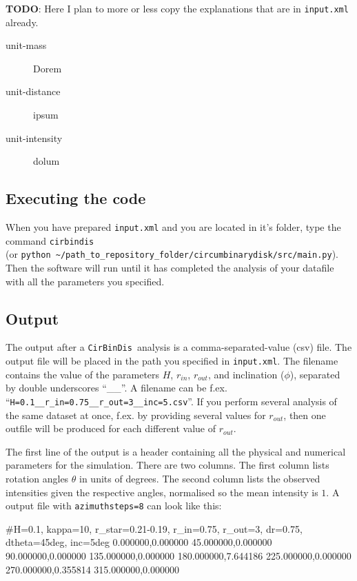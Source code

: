 \documentclass[a4paper, 12pt, english, titlepage]{article}
\newcommand{\sname}{\texttt{CirBinDis }}
\begin{document}
    \textbf{TODO}: Here I plan to more or less copy the explanations that are in \texttt{input.xml} already.

    \begin{description}
        \item[unit-mass] Dorem
        \item[unit-distance] ipsum
        \item[unit-intensity] dolum
    \end{description}

\subsection{Executing the code}
    When you have prepared \texttt{input.xml} and you are located in it's folder, type the command \texttt{cirbindis} \\
    (or \texttt{python \textasciitilde/path\_to\_repository\_folder/circumbinarydisk/src/main.py}).
    Then the software will run until it has completed the analysis of your datafile with all the parameters you specified.

\subsection{Output}
    The output after a \sname analysis is a comma-separated-value (csv) file. The output file will be placed in the path you specified in \texttt{input.xml}. The filename contains the value of the parameters $H$, $r_{in}$, $r_{out}$, and inclination ($\phi$), separated by double underscores ``\_\_''. A filename can be f.ex.
    ``\texttt{H=0.1\_\_r\_in=0.75\_\_r\_out=3\_\_inc=5.csv}''.
    If you perform several analysis of the same dataset at once, f.ex. by providing several values for $r_{out}$, then one outfile will be produced for each different value of $r_{out}$.

    The first line of the output is a header containing all the physical and numerical parameters for the simulation. There are two columns. The first column lists rotation angles $\theta$ in units of degrees. The second column lists the observed intensities given the respective angles, normalised so the mean intensity is $1$. A output file with \texttt{azimuthsteps=8} can look like this:
\begin{verbatim*}
#H=0.1, kappa=10, r_star=0.21-0.19, r_in=0.75, r_out=3, dr=0.75,
dtheta=45deg, inc=5deg
0.000000,0.000000
45.000000,0.000000
90.000000,0.000000
135.000000,0.000000
180.000000,7.644186
225.000000,0.000000
270.000000,0.355814
315.000000,0.000000
\end{verbatim*}
\end{document}
